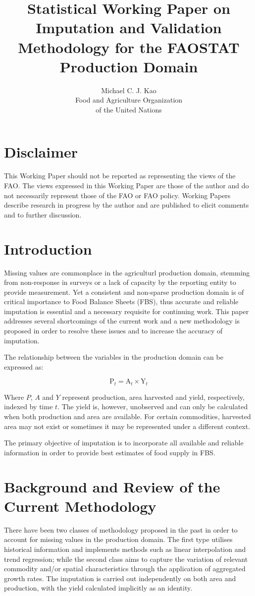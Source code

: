 \documentclass[nojss]{jss}\usepackage{graphicx, color}
\title{\bf Statistical Working Paper on Imputation and Validation
  Methodology for the FAOSTAT Production Domain}
\author{Michael C. J. Kao\\ Food and Agriculture Organization \\ of
  the United Nations}
\begin{document}
\section*{Disclaimer}
This Working Paper should not be reported as representing the views of
the FAO. The views expressed in this Working Paper are those of the
author and do not necessarily represent those of the FAO or FAO
policy. Working Papers describe research in progress by the author and
are published to elicit comments and to further discussion.

\section{Introduction}
Missing values are commonplace in the agriculturl production domain,
stemming from non-response in surveys or a lack of capacity by the
reporting entity to provide measurement. Yet a consistent and
non-sparse production domain is of critical importance to Food Balance
Sheets (FBS), thus accurate and reliable imputation is essential and a
necessary requisite for continuing work. This paper addresses several
shortcomings of the current work and a new methodology is proposed in
order to resolve these issues and to increase the accuracy of
imputation.

The relationship between the variables in the production domain can be
expressed as:

\begin{equation}
  \label{eq:identity}
  \text{P}_t = \text{A}_t \times \text{Y}_t
\end{equation}


Where $P$, $A$ and $Y$ represent production, area harvested and yield,
respectively, indexed by time $t$. The yield is, however, unobserved and
can only be calculated when both production and area are
available. For certain commodities, harvested area may not exist or
sometimes it may be represented under a different context.


The primary objective of imputation is to incorporate all
available and reliable information in order to provide best estimates of
food supply in FBS.

\section{Background and Review of the Current Methodology}

There have been two classes of methodology proposed in the past in
order to account for missing values in the production domain. The
first type utilises historical information and implements methods such
as linear interpolation and trend regression; while the second class
aims to capture the variation of relevant commodity
and/or spatial characteristics through the application of
aggregated growth rates. The imputation is carried out independently
on both area and production, with the yield calculated implicitly as
an identity.
\end{document}
